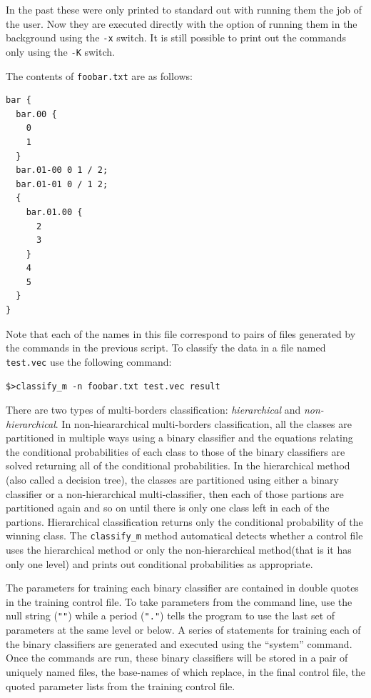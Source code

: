 \documentclass[12pt]{article}
\begin{document}
In the past these were only printed to standard out with running them the
job of the user. Now they are executed directly with the option of 
running them in the background using the \verb"-x" switch.
It is still possible to print out the commands only using the \verb"-K"
switch.

The contents of \verb"foobar.txt" are as follows:
\begin{verbatim}
bar {
  bar.00 {
    0
    1 
  }
  bar.01-00 0 1 / 2;
  bar.01-01 0 / 1 2;
  {
    bar.01.00 {
      2
      3
    }
    4
    5
  }
}
\end{verbatim}

Note that each of the names in this file correspond to pairs of files generated by the commands in the previous script. To classify the data in a file named \verb"test.vec" use the following command:

\begin{verbatim}
$>classify_m -n foobar.txt test.vec result
\end{verbatim}

There are two types of multi-borders classification: {\it hierarchical} and {\it non-hierarchical}.  In non-hieararchical multi-borders classification, all the classes are partitioned in multiple ways using a binary classifier and the equations relating the conditional probabilities of each class to those of the binary classifiers are solved returning all of the conditional probabilities.  In the hierarchical method (also called a decision tree), the classes are partitioned using either a binary classifier or a non-hierarchical multi-classifier, then each of those partions are partitioned again and so on until there is only one class left in each of the partions.  Hierarchical classification returns only the conditional probability of the winning class.  The \verb/classify_m/ method automatical detects whether a control file uses the hierarchical method or only the non-hierarchical method(that is it has only one level) and prints out conditional probabilities as appropriate.  

  The parameters for training each binary classifier are contained in double quotes in the training control file.  To take parameters from the command line, use the null string (\verb/""/) while a period (\verb/"."/) tells the program to use the last set of parameters at the same level or below.  A series of statements for training each of the binary classifiers are generated and executed using the ``system'' command.  Once the commands are run, these binary classifiers will be stored in a pair of uniquely named files, the base-names of which replace, in the final control file, the quoted parameter lists from the training control file.
\end{document}
